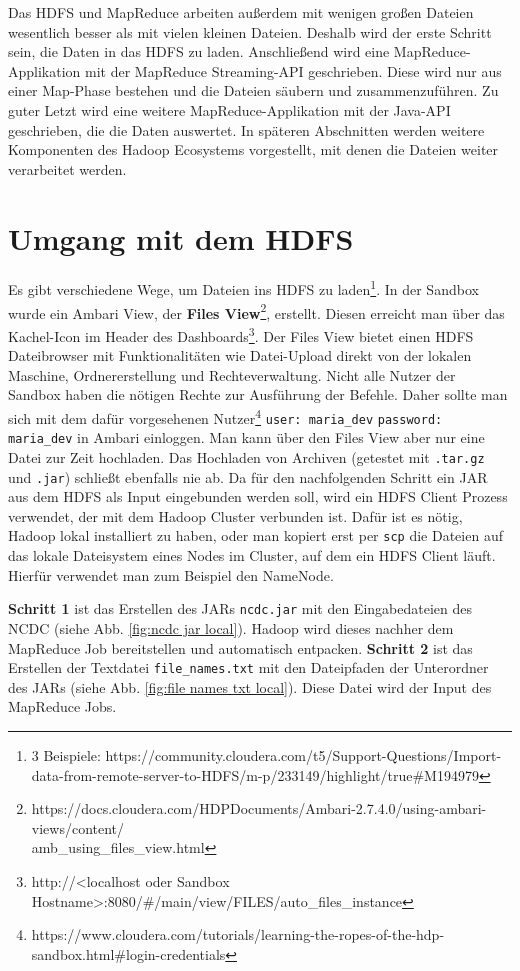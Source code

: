 Das HDFS und MapReduce arbeiten außerdem mit wenigen großen Dateien wesentlich besser als mit vielen kleinen Dateien.\cite[\textit{(S. 19-30, 693-695)}]{white_hadoop_2015} Deshalb wird der erste Schritt sein, die Daten in das HDFS zu laden. Anschließend wird eine MapReduce-Applikation mit der MapReduce Streaming-API geschrieben. Diese wird nur aus einer Map-Phase bestehen und die Dateien säubern und zusammenzuführen. Zu guter Letzt wird eine weitere MapReduce-Applikation mit der Java-API geschrieben, die die Daten auswertet. In späteren Abschnitten werden weitere Komponenten des Hadoop Ecosystems vorgestellt, mit denen die Dateien weiter verarbeitet werden.

\section{Umgang mit dem HDFS}
\label{chap:fund sec:core sub:handson hdfs}
Es gibt verschiedene Wege, um Dateien ins HDFS zu laden\footnote{3 Beispiele: https://community.cloudera.com/t5/Support-Questions/Import-data-from-remote-server-to-HDFS/m-p/233149/highlight/true\#M194979}. In der Sandbox wurde ein Ambari View, der \textbf{Files View}\footnote{https://docs.cloudera.com/HDPDocuments/Ambari-2.7.4.0/using-ambari-views/content/\\amb\_using\_files\_view.html}, erstellt. Diesen erreicht man über das Kachel-Icon im Header des Dashboards\footnote{http://<localhost oder Sandbox Hostname>:8080/\#/main/view/FILES/auto\_files\_instance}. Der Files View bietet einen HDFS Dateibrowser mit Funktionalitäten wie Datei-Upload direkt von der lokalen Maschine, Ordnererstellung und Rechteverwaltung. Nicht alle Nutzer der Sandbox haben die nötigen Rechte zur Ausführung der Befehle. Daher sollte man sich mit dem dafür vorgesehenen Nutzer\footnote{https://www.cloudera.com/tutorials/learning-the-ropes-of-the-hdp-sandbox.html\#login-credentials} \verb|user: maria_dev| \verb|password: maria_dev| in Ambari einloggen. Man kann über den Files View aber nur eine Datei zur Zeit hochladen. Das Hochladen von Archiven (getestet mit \verb|.tar.gz| und \verb|.jar|) schließt ebenfalls nie ab. Da für den nachfolgenden Schritt ein JAR aus dem HDFS als Input eingebunden werden soll, wird ein HDFS Client Prozess verwendet, der mit dem Hadoop Cluster verbunden ist. Dafür ist es nötig, Hadoop lokal installiert zu haben, oder man kopiert erst per \verb|scp| die Dateien auf das lokale Dateisystem eines Nodes im Cluster, auf dem ein HDFS Client läuft. Hierfür verwendet man zum Beispiel den NameNode. 
\par
\textbf{Schritt 1} ist das Erstellen des JARs \verb|ncdc.jar| mit den Eingabedateien des NCDC (siehe Abb. \ref{fig:ncdc jar local}). Hadoop wird dieses nachher dem MapReduce Job bereitstellen und automatisch entpacken. \textbf{Schritt 2} ist das Erstellen der Textdatei \verb|file_names.txt| mit den Dateipfaden der Unterordner des JARs (siehe Abb. \ref{fig:file names txt local}). Diese Datei wird der Input des MapReduce Jobs. 

